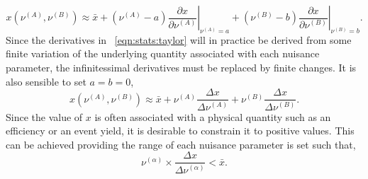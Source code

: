 \begin{equation}
\label{eqn:stats:taylor}
x(\nu^{(A)}, \nu^{(B)}) \approx \bar{x} +
(\nu^{(A)} - a)\left.\frac{\partial x}{\partial\nu^{(A)}}\right|_{\nu^{(A)}=a} +
(\nu^{(B)} - b)\left.\frac{\partial x}{\partial\nu^{(B)}}\right|_{\nu^{(B)}=b}.
\end{equation}
Since the derivatives in \eqn~\ref{eqn:stats:taylor} will in practice be
derived from some finite variation of the underlying quantity associated with
each nuisance parameter, the infinitessimal derivatives must be replaced by
finite changes. It is also sensible to set $a=b=0$,
\begin{equation}
\label{eqn:stats:taylor2}
x(\nu^{(A)}, \nu^{(B)}) \approx \bar{x} +
\nu^{(A)}\frac{\Delta x}{\Delta\nu^{(A)}} +
\nu^{(B)}\frac{\Delta x}{\Delta\nu^{(B)}}.
\end{equation}
Since the value of $x$ is often associated with a physical quantity such as an
efficiency or an event yield, it is desirable to constrain it to positive
values. This can be achieved providing the range of each nuisance parameter is
set such that,
\begin{equation*}
\nu^{(\alpha)}\times\frac{\Delta x}{\Delta \nu^{(\alpha)}} < \bar{x}.
\end{equation*}

